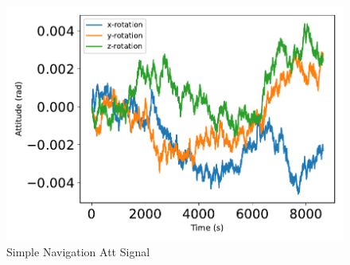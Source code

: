 \begin{figure}[htbp]\centerline{\includegraphics[height=0.4\textwidth, keepaspectratio]{AutoTeX/SimpleNavAtt}}\caption{Simple Navigation Att Signal}\label{fig:SimpleNavAtt}\end{figure}